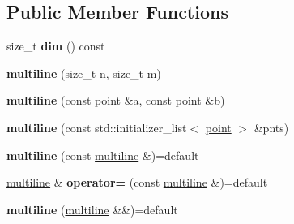 \subsection*{Public Member Functions}
\begin{DoxyCompactItemize}
\item 
size\+\_\+t {\bfseries dim} () const \hypertarget{classgxx_1_1ngeom_1_1multiline_adb243bed1e40f6706c0a278d33683250}{}\label{classgxx_1_1ngeom_1_1multiline_adb243bed1e40f6706c0a278d33683250}

\item 
{\bfseries multiline} (size\+\_\+t n, size\+\_\+t m)\hypertarget{classgxx_1_1ngeom_1_1multiline_a2c3e192065e1c6e662e3b28cd3ae0885}{}\label{classgxx_1_1ngeom_1_1multiline_a2c3e192065e1c6e662e3b28cd3ae0885}

\item 
{\bfseries multiline} (const \hyperlink{classgxx_1_1ngeom_1_1point}{point} \&a, const \hyperlink{classgxx_1_1ngeom_1_1point}{point} \&b)\hypertarget{classgxx_1_1ngeom_1_1multiline_a45ca07dffef906ad5ecbf79e19418074}{}\label{classgxx_1_1ngeom_1_1multiline_a45ca07dffef906ad5ecbf79e19418074}

\item 
{\bfseries multiline} (const std\+::initializer\+\_\+list$<$ \hyperlink{classgxx_1_1ngeom_1_1point}{point} $>$ \&pnts)\hypertarget{classgxx_1_1ngeom_1_1multiline_add8c0f1e5ccaf0795a8ac45d90c77068}{}\label{classgxx_1_1ngeom_1_1multiline_add8c0f1e5ccaf0795a8ac45d90c77068}

\item 
{\bfseries multiline} (const \hyperlink{classgxx_1_1ngeom_1_1multiline}{multiline} \&)=default\hypertarget{classgxx_1_1ngeom_1_1multiline_a3327b1d79ca0b37c242cb93aa6165845}{}\label{classgxx_1_1ngeom_1_1multiline_a3327b1d79ca0b37c242cb93aa6165845}

\item 
\hyperlink{classgxx_1_1ngeom_1_1multiline}{multiline} \& {\bfseries operator=} (const \hyperlink{classgxx_1_1ngeom_1_1multiline}{multiline} \&)=default\hypertarget{classgxx_1_1ngeom_1_1multiline_a1f7d76881f2f47976b79dbbf3ac32ba8}{}\label{classgxx_1_1ngeom_1_1multiline_a1f7d76881f2f47976b79dbbf3ac32ba8}

\item 
{\bfseries multiline} (\hyperlink{classgxx_1_1ngeom_1_1multiline}{multiline} \&\&)=default\hypertarget{classgxx_1_1ngeom_1_1multiline_a31565dda8206f88ac25b7153140d2b6f}{}\label{classgxx_1_1ngeom_1_1multiline_a31565dda8206f88ac25b7153140d2b6f}


\end{DoxyCompactItemize}
